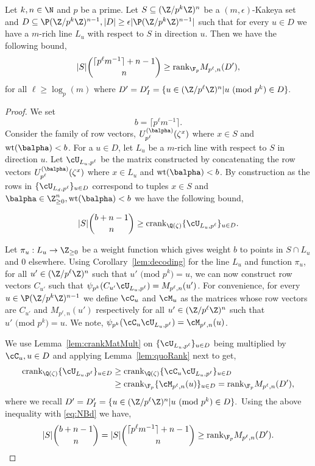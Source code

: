 \begin{lem}\label{fm:rkBd}
Let $k,n\in \N$ and $p$ be a prime. Let $S\subseteq (\Z/p^k\Z)^n$ be a $(m,\epsilon)$-Kakeya set and $D\subseteq \P (\Z/p^k\Z)^{n-1},|D|\ge \epsilon |\P (\Z/p^k\Z)^{n-1}|$ such that for every $u\in D$ we have a $m$-rich line $L_u$ with respect to $S$ in direction $u$. Then we have the following bound,
{\em $$ |S|\binom{\lceil p^\ell m^{-1} \rceil+n-1}{n} \ge \text{rank}_{\F_p} M_{p^\ell,n}(D'),$$}
for all $\ell \ge \log_p(m)$ where {\em$D'=D'_I=\{u\in (\Z/p^\ell\Z)^{n}| u\text{ (mod }p^k\text{)}\in D\}.$}
\end{lem}
\begin{proof}
We set
$$b=\lceil p^\ell m^{-1} \rceil.$$
Consider the family of row vectors, $U_{p^\ell}^{(\balpha)}(\zeta^x)$ where $x\in S$ and $\text{wt}(\balpha)<b$. For a $u\in D$, let $L_u$ be a $m$-rich line with respect to $S$ in direction $u$. Let $\cU_{L_u,p^\ell}$ be the matrix constructed by concatenating the row vectors $U_{p^\ell}^{(\balpha)}(\zeta^x)$ where $x\in L_u$ and $\text{wt}(\balpha)<b$. By construction as the rows in $\{\cU_{L_d,p^\ell}\}_{u\in D}$ correspond to tuples $x\in S$ and $\balpha\in \Z_{\ge 0}^n, \text{wt}(\balpha)<b$ we have the following bound,

\begin{align}\label{eq:NBd}
    |S|\binom{b+n-1}{n} \ge \text{crank}_{\Q(\zeta)} \{\cU_{L_u,p^\ell}\}_{u\in D}.
\end{align}

Let $\pi_u:L_u\rightarrow \Z_{\ge 0}$ be a weight function which gives weight $b$ to points in $S\cap L_u$ and $0$ elsewhere. Using Corollary~\ref{lem:decoding} for the line $L_u$ and function $\pi_u$, for all $u' \in (\Z/p^\ell\Z)^{n}$ such that $u' \text{ (mod }p^k\text{)}=u$, we can now construct row vectors $C_{u'}$ such that $\psi_{p^k}(C_{u'}\cU_{L_u,p^\ell})=M_{p^\ell,n}(u')$.  For convenience, for every $u\in \P (\Z/p^k\Z)^{n-1}$ we define $\cC_u$ and $\cM_u$ as the matrices whose row vectors are $C_{u'}$ and $M_{p^\ell,n}(u')$ respectively for all $u'\in (\Z/p^\ell\Z)^{n}$ such that $u' \text{ (mod }p^k\text{)}=u$. We note, $\psi_{p^k}(\cC_{u}\cU_{L_u,p^\ell})=\cM_{p^\ell,n}(u)$.

We use Lemma~\ref{lem:crankMatMult} on $\{\cU_{L_u,p^\ell}\}_{u\in D}$ being multiplied by $\cC_u,u\in D$ and applying Lemma~\ref{lem:quoRank} next to get,
\begin{align*}
    \text{crank}_{\Q(\zeta)} \{\cU_{L_u,p^\ell}\}_{u\in D}&\ge \text{crank}_{\Q(\zeta)} \{\cC_{u}\cU_{L_u,p^\ell}\}_{u\in D}\\
    &\ge  \text{crank}_{\F_p} \{\cM_{p^\ell,n}(u)\}_{u\in D}=\text{rank}_{\F_p} M_{p^\ell,n}(D'),
\end{align*}
where we recall $D'=D'_I=\{u\in (\Z/p^\ell\Z)^{n}| u\text{ (mod }p^k\text{)}\in D\}.$
Using the above inequality with \eqref{eq:NBd} we have,
\begin{align*}
|S|\binom{b+n-1}{n}=    |S|\binom{\lceil p^\ell m^{-1} \rceil+n-1}{n}\ge  \text{rank}_{\F_p} M_{p^\ell,n}(D').
\end{align*}
\end{proof}


